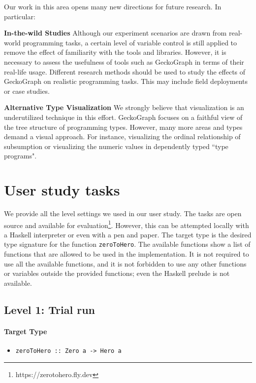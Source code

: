 \documentclass[preprint,12pt]{elsarticle}
\begin{document}
Our work in this area opens many new directions for future research.  In particular:

\noindent\textbf{In-the-wild Studies}
Although our experiment scenarios are drawn from real-world programming tasks, a certain level of variable control is still applied to remove the effect of familiarity with the tools and libraries. However, it is necessary to assess the usefulness of tools such as GeckoGraph in terms of their real-life usage. Different research methods should be used to study the effects of GeckoGraph on realistic programming tasks. This may include field deployments or case studies. 

\noindent\textbf{Alternative Type Visualization}
We strongly believe that visualization is an underutilized technique in this effort. GeckoGraph focuses on a faithful view of the tree structure of programming types. However, many more areas and types demand a visual approach. For instance, visualizing the ordinal relationship of subsumption or visualizing the numeric values in dependently typed ``type programs". 

 


\appendix
\section{User study tasks} \label{levels}
We provide all the level settings we used in our user study. The tasks are open source and available for evaluation\footnote{https://zerotohero.fly.dev}. However, this can be attempted locally with a Haskell interpreter or even with a pen and paper. The target type is the desired type signature for the function \texttt{zeroToHero}. The available functions show a list of functions that are allowed to be used in the implementation. It is not required to use all the available functions, and it is not forbidden to use any other functions or variables outside the provided functions; even the Haskell prelude is not available. 


\subsection{Level 1: Trial run}

\paragraph{Target Type } 
\begin{itemize}
    \item \texttt{zeroToHero :: Zero a -> Hero a}
\end{itemize}
\end{document}
